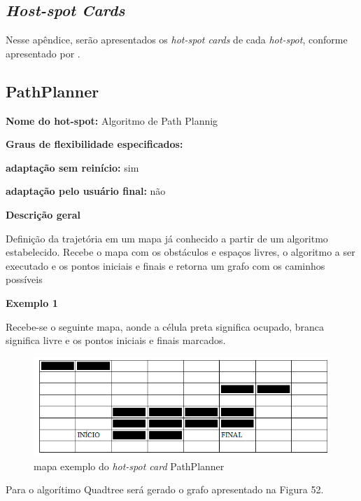 \begin{apendicesenv}

\partapendices

\chapter{\textit{Host-spot Cards}}

Nesse apêndice, serão apresentados os \textit{hot-spot cards} de cada \textit{hot-spot}, conforme apresentado por \cite{Fayad1999}.

\section{PathPlanner}

{\large \textbf{Nome do hot-spot:}} Algoritmo de Path Plannig

{\large \textbf{Graus de flexibilidade especificados:}}

\textbf{adaptação sem reinício:} sim

\textbf{adaptação pelo usuário final:} não

{\large \textbf{Descrição geral}}

Definição da trajetória em um mapa já conhecido a partir de um algoritmo estabelecido. Recebe o mapa com os obstáculos e espaços livres, o algoritmo a ser executado e os pontos iniciais e finais e retorna um grafo com os caminhos possíveis

{\large \textbf{Exemplo 1}}

Recebe-se o seguinte mapa, aonde a célula preta significa ocupado, branca significa livre e os pontos iniciais e finais marcados.

\begin{figure}[H]
	\centering
	\label{fig51}
		\includegraphics[keepaspectratio=true,scale=0.7]{figuras/mapahotspot1.PNG}
	\caption{mapa exemplo do \textit{hot-spot card} PathPlanner}
\end{figure}

Para o algorítimo Quadtree será gerado o grafo apresentado na Figura 52.


\end{apendicesenv}

